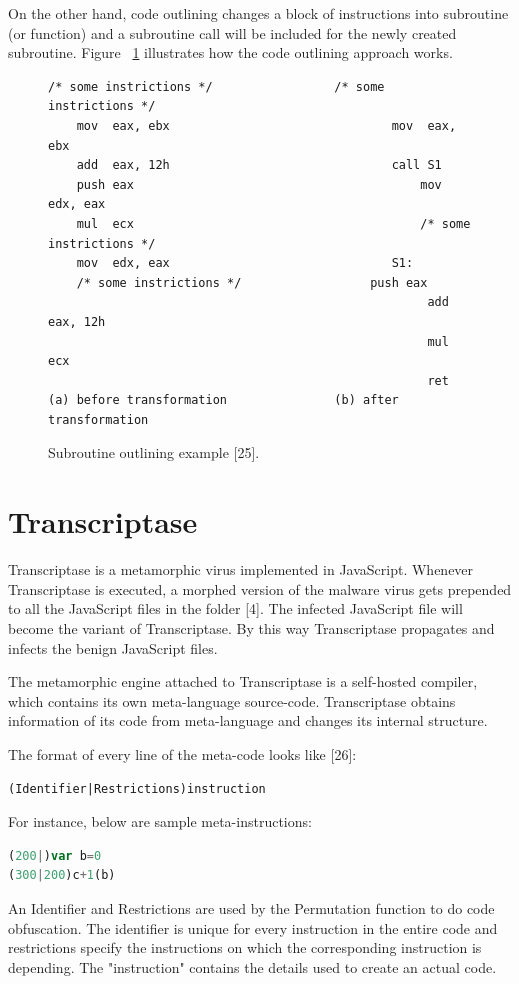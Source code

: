 On the other hand, code outlining changes a block of instructions into subroutine (or function) and a subroutine call will be included for the newly created subroutine. Figure ~\ref{fig:subroutineoutline} illustrates how the code outlining approach works.
\begin{figure}
  \centering
  \begin{lstlisting}[language=myasm]
	/* some instrictions */					/* some instrictions */
	mov  eax, ebx								mov  eax, ebx
	add  eax, 12h								call S1
	push eax										mov  edx, eax
	mul  ecx										/* some instrictions */
	mov  edx, eax								S1: 
	/* some instrictions */ 				 push eax
										 	 	 	 add  eax, 12h
										 	 	 	 mul  ecx
										 	 	 	 ret
(a) before transformation				(b) after transformation
\end{lstlisting}


    \caption[Subroutine outlining example]{Subroutine outlining example [25].}
    \label{fig:subroutineoutline}
\end{figure}

\section{Transcriptase}

Transcriptase is a metamorphic virus implemented in JavaScript. Whenever Transcriptase is executed, a morphed version of the malware virus gets prepended to all the JavaScript files in the folder [4]. The infected JavaScript file will become the variant of Transcriptase. By this way Transcriptase propagates and infects the benign JavaScript files.
  
The metamorphic engine attached to Transcriptase is a self-hosted compiler, which contains its own meta-language source-code. Transcriptase obtains information of its code from meta-language and changes its internal structure. 

The format of every line of the meta-code looks like [26]:

\begin{lstlisting}[frame=none,numbers=none]
(Identifier|Restrictions)instruction
\end{lstlisting}
For instance, below are sample meta-instructions:

\begin{lstlisting}[frame=none,numbers=none,language=JavaScript]
(200|)var b=0
(300|200)c+1(b)
\end{lstlisting}

An Identifier and Restrictions are used by the Permutation function to do code obfuscation. The identifier is unique for every instruction in the entire code and restrictions specify the instructions on which the corresponding instruction is depending. The "instruction" contains the details used to create an actual code. 

